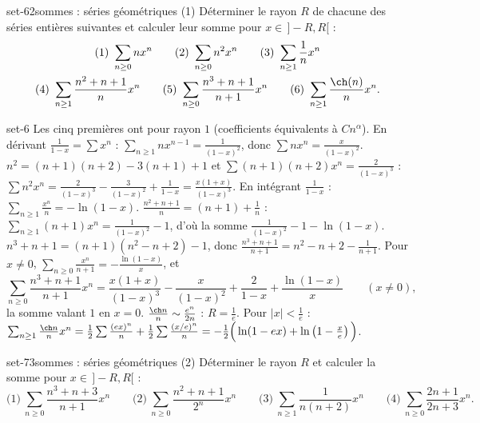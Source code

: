 \begin{exo}{set-6}{2}{sommes : séries géométriques (1)}
Déterminer le rayon $R$ de chacune des séries entières suivantes et calculer leur somme pour $x\in\,]-R,R[$ :
\begin{gather*}\text{(1)}\ \sum_{n\geq0}nx^n\qquad\text{(2)}\ \sum_{n\geq0}n^2x^n\qquad\text{(3)}\ \sum_{n\geq1}\frac1nx^n\\
\text{(4)}\ \sum_{n\geq1}\frac{n^2+n+1}nx^n\qquad\text{(5)}\ \sum_{n\geq0}\frac{n^3+n+1}{n+1}x^n\qquad\text{(6)}\ \sum_{n\geq1}\frac{\ch(n)}nx^n.\end{gather*}
\end{exo}

\begin{corrige}{set-6}
Les cinq premières ont pour rayon $1$ (coefficients équivalents à $Cn^\alpha$).
 En dérivant $\frac1{1-x}=\sum x^n$ : $\sum_{n\geq1}nx^{n-1}=\frac1{(1-x)^2}$, donc $\sum nx^n=\frac x{(1-x)^2}$.
 $n^2=(n+1)(n+2)-3(n+1)+1$ et $\sum(n+1)(n+2)x^n=\frac2{(1-x)^3}$ : $\sum n^2x^n=\frac2{(1-x)^3}-\frac3{(1-x)^2}+\frac1{1-x}=\frac{x(1+x)}{(1-x)^3}$.
 En intégrant $\frac1{1-x}$ : $\sum_{n\geq1}\frac{x^n}n=-\ln(1-x)$.
 $\frac{n^2+n+1}n=(n+1)+\frac1n$ : $\sum_{n\geq1}(n+1)x^n=\frac1{(1-x)^2}-1$, d'où la somme $\frac1{(1-x)^2}-1-\ln(1-x)$.
 $n^3+n+1=(n+1)(n^2-n+2)-1$, donc $\frac{n^3+n+1}{n+1}=n^2-n+2-\frac1{n+1}$. Pour $x\neq0$, $\sum_{n\geq0}\frac{x^n}{n+1}=-\frac{\ln(1-x)}x$, et
\[\sum_{n\geq0}\frac{n^3+n+1}{n+1}x^n=\frac{x(1+x)}{(1-x)^3}-\frac x{(1-x)^2}+\frac2{1-x}+\frac{\ln(1-x)}x\qquad(x\neq0),\]
la somme valant $1$ en $x=0$.
 $\frac{\ch n}n\sim\frac{e^n}{2n}$ : $R=\frac1e$. Pour $|x|<\frac1e$ : $\sum_{n\geq1}\frac{\ch n}nx^n=\frac12\sum\frac{(ex)^n}n+\frac12\sum\frac{(x/e)^n}n
=-\frac12\Big(\ln(1-ex)+\ln\left(1-\frac xe\right)\Big)$.
\end{corrige}

\begin{exo}{set-7}{3}{sommes : séries géométriques (2)}
Déterminer le rayon $R$ et calculer la somme pour $x\in\,]-R,R[$ :
\[\text{(1)}\ \sum_{n\geq0}\frac{n^3+n+3}{n+1}x^n\qquad\text{(2)}\ \sum_{n\geq0}\frac{n^2+n+1}{2^n}x^n\qquad\text{(3)}\ \sum_{n\geq1}\frac1{n(n+2)}x^n\qquad
\text{(4)}\ \sum_{n\geq0}\frac{2n+1}{2n+3}x^n.\]
\end{exo}

